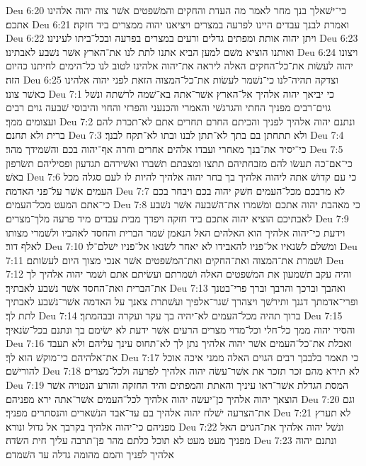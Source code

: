 Deu 6:20  כי־ישׁאלך בנך מחר לאמר מה העדת והחקים והמשׁפטים אשׁר צוה יהוה אלהינו אתכם׃
Deu 6:21  ואמרת לבנך עבדים היינו לפרעה במצרים ויציאנו יהוה ממצרים ביד חזקה׃
Deu 6:22  ויתן יהוה אותת ומפתים גדלים ורעים במצרים בפרעה ובכל־ביתו לעינינו׃
Deu 6:23  ואותנו הוציא משׁם למען הביא אתנו לתת לנו את־הארץ אשׁר נשׁבע לאבתינו׃
Deu 6:24  ויצונו יהוה לעשׂות את־כל־החקים האלה ליראה את־יהוה אלהינו לטוב לנו כל־הימים לחיתנו כהיום הזה׃
Deu 6:25  וצדקה תהיה־לנו כי־נשׁמר לעשׂות את־כל־המצוה הזאת לפני יהוה אלהינו כאשׁר צונו׃
Deu 7:1  כי יביאך יהוה אלהיך אל־הארץ אשׁר־אתה בא־שׁמה לרשׁתה ונשׁל גוים־רבים מפניך החתי והגרגשׁי והאמרי והכנעני והפרזי והחוי והיבוסי שׁבעה גוים רבים ועצומים ממך׃
Deu 7:2  ונתנם יהוה אלהיך לפניך והכיתם החרם תחרים אתם לא־תכרת להם ברית ולא תחנם׃
Deu 7:3  ולא תתחתן בם בתך לא־תתן לבנו ובתו לא־תקח לבנך׃
Deu 7:4  כי־יסיר את־בנך מאחרי ועבדו אלהים אחרים וחרה אף־יהוה בכם והשׁמידך מהר׃
Deu 7:5  כי־אם־כה תעשׂו להם מזבחתיהם תתצו ומצבתם תשׁברו ואשׁירהם תגדעון ופסיליהם תשׂרפון באשׁ׃
Deu 7:6  כי עם קדושׁ אתה ליהוה אלהיך בך בחר יהוה אלהיך להיות לו לעם סגלה מכל העמים אשׁר על־פני האדמה׃
Deu 7:7  לא מרבכם מכל־העמים חשׁק יהוה בכם ויבחר בכם כי־אתם המעט מכל־העמים׃
Deu 7:8  כי מאהבת יהוה אתכם ומשׁמרו את־השׁבעה אשׁר נשׁבע לאבתיכם הוציא יהוה אתכם ביד חזקה ויפדך מבית עבדים מיד פרעה מלך־מצרים׃
Deu 7:9  וידעת כי־יהוה אלהיך הוא האלהים האל הנאמן שׁמר הברית והחסד לאהביו ולשׁמרי מצותו לאלף דור׃
Deu 7:10  ומשׁלם לשׂנאיו אל־פניו להאבידו לא יאחר לשׂנאו אל־פניו ישׁלם־לו׃
Deu 7:11  ושׁמרת את־המצוה ואת־החקים ואת־המשׁפטים אשׁר אנכי מצוך היום לעשׂותם׃
Deu 7:12  והיה עקב תשׁמעון את המשׁפטים האלה ושׁמרתם ועשׂיתם אתם ושׁמר יהוה אלהיך לך את־הברית ואת־החסד אשׁר נשׁבע לאבתיך׃
Deu 7:13  ואהבך וברכך והרבך וברך פרי־בטנך ופרי־אדמתך דגנך ותירשׁך ויצהרך שׁגר־אלפיך ועשׁתרת צאנך על האדמה אשׁר־נשׁבע לאבתיך לתת לך׃
Deu 7:14  ברוך תהיה מכל־העמים לא־יהיה בך עקר ועקרה ובבהמתך׃
Deu 7:15  והסיר יהוה ממך כל־חלי וכל־מדוי מצרים הרעים אשׁר ידעת לא ישׂימם בך ונתנם בכל־שׂנאיך׃
Deu 7:16  ואכלת את־כל־העמים אשׁר יהוה אלהיך נתן לך לא־תחוס עינך עליהם ולא תעבד את־אלהיהם כי־מוקשׁ הוא לך׃
Deu 7:17  כי תאמר בלבבך רבים הגוים האלה ממני איכה אוכל להורישׁם׃
Deu 7:18  לא תירא מהם זכר תזכר את אשׁר־עשׂה יהוה אלהיך לפרעה ולכל־מצרים׃
Deu 7:19  המסת הגדלת אשׁר־ראו עיניך והאתת והמפתים והיד החזקה והזרע הנטויה אשׁר הוצאך יהוה אלהיך כן־יעשׂה יהוה אלהיך לכל־העמים אשׁר־אתה ירא מפניהם׃
Deu 7:20  וגם את־הצרעה ישׁלח יהוה אלהיך בם עד־אבד הנשׁארים והנסתרים מפניך׃
Deu 7:21  לא תערץ מפניהם כי־יהוה אלהיך בקרבך אל גדול ונורא׃
Deu 7:22  ונשׁל יהוה אלהיך את־הגוים האל מפניך מעט מעט לא תוכל כלתם מהר פן־תרבה עליך חית השׂדה׃
Deu 7:23  ונתנם יהוה אלהיך לפניך והמם מהומה גדלה עד השׁמדם׃
